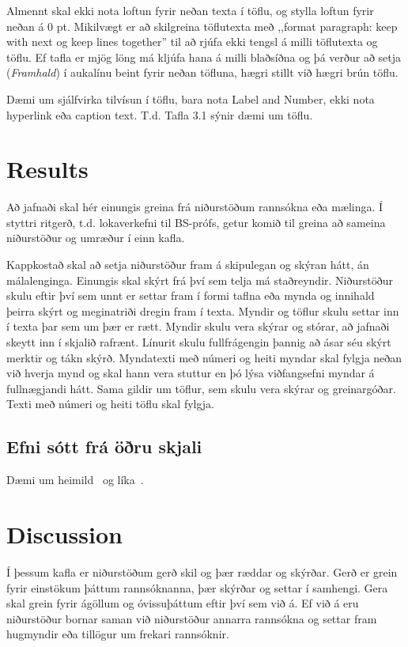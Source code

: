 \documentclass[a4paper,12pt,twoside,BCOR=10mm]{scrbook}
\begin{document}
Almennt skal ekki nota loftun fyrir neðan texta í töflu, og stylla loftun fyrir neðan á 0 pt.
Mikilvægt er að skilgreina töflutexta með ,,format paragraph: keep with next og keep lines together” til að rjúfa ekki tengsl á milli töflutexta og töflu. Ef tafla er mjög löng má kljúfa hana á milli blaðsíðna og þá verður að setja (\textit{Framhald}) í aukalínu beint fyrir neðan töfluna, hægri stillt við hægri brún töflu.

Dæmi um sjálfvirka tilvísun í töflu, bara nota Label and Number, ekki nota hyperlink eða caption text. T.d. Tafla 3.1 sýnir dæmi um töflu.

\chapter{Results}
Að jafnaði skal hér einungis greina frá niðurstöðum rannsókna eða mælinga. Í styttri ritgerð, t.d. lokaverkefni til BS-prófs, getur komið til greina að sameina niðurstöður og umræður í einn kafla.

Kappkostað skal að setja niðurstöður fram á skipulegan og skýran hátt, án málalenginga. Einungis skal skýrt frá því sem telja má staðreyndir. Niðurstöður skulu eftir því sem unnt er settar fram í formi taflna eða mynda og innihald þeirra skýrt og meginatriði dregin fram í texta. Myndir og töflur skulu settar inn í texta þar sem um þær er rætt. Myndir skulu vera skýrar og stórar, að jafnaði skeytt inn í skjalið rafrænt. Línurit skulu fullfrágengin þannig að ásar séu skýrt merktir og tákn skýrð. Myndatexti með númeri og heiti myndar skal fylgja neðan við hverja mynd og skal hann vera stuttur en þó lýsa viðfangsefni myndar á fullnægjandi hátt. Sama gildir um töflur, sem skulu vera skýrar og greinargóðar. Texti með númeri og heiti töflu skal fylgja.

\section{Efni sótt frá öðru skjali}
Dæmi um heimild~\cite{dirac} og líka~\cite{einstein}.


\chapter{Discussion}
Í þessum kafla er niðurstöðum gerð skil og þær ræddar og skýrðar. Gerð er grein fyrir einstökum þáttum rannsóknanna, þær skýrðar og settar í samhengi. Gera skal grein fyrir ágöllum og óvissuþáttum eftir því sem við á. Ef við á eru niðurstöður bornar saman við niðurstöður annarra rannsókna og settar fram hugmyndir eða tillögur um frekari rannsóknir.
\end{document}
